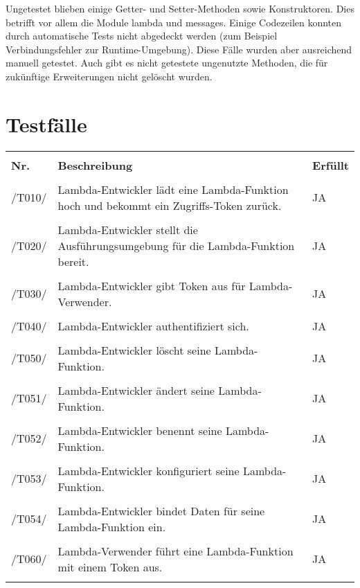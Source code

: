 \documentclass[a4paper,20pt,oneside]{book}
\begin{document}
	Ungetestet blieben einige Getter- und Setter-Methoden sowie Konstruktoren. Dies betrifft vor allem die Module lambda und messages.  Einige Codezeilen konnten durch automatische Tests nicht abgedeckt werden (zum Beispiel Verbindungsfehler zur Runtime-Umgebung). Diese Fälle wurden aber ausreichend manuell getestet. Auch gibt es nicht getestete ungenutzte Methoden, die für zukünftige Erweiterungen nicht gelöscht wurden.
	
	
	\chapter{Testfälle}
	\begin{longtable}{lp{10cm}p{3cm}}
		\hline \\
		\textbf{Nr.} & \textbf{Beschreibung} & \textbf{Erfüllt} \\ \hline\hline \\ 
		/T010/ & Lambda-Entwickler lädt eine Lambda-Funktion hoch und bekommt ein Zugriffs-Token zurück. & JA   \\ \hline \\
		/T020/ & Lambda-Entwickler stellt die Ausführungsumgebung für die Lambda-Funktion bereit. & JA\\ \hline \\
		/T030/ & Lambda-Entwickler gibt Token aus für Lambda-Verwender. & JA\\ \hline \\
		/T040/ & Lambda-Entwickler authentifiziert sich. & JA\\ \hline \\
		/T050/ & Lambda-Entwickler löscht seine Lambda-Funktion. & JA \\ \hline \\
		/T051/ & Lambda-Entwickler ändert seine Lambda-Funktion. & JA \\ \hline \\
		/T052/ & Lambda-Entwickler benennt seine Lambda-Funktion. & JA\\ \hline \\
		/T053/ & Lambda-Entwickler konfiguriert seine Lambda-Funktion. & JA\\ \hline \\
		/T054/ & Lambda-Entwickler bindet Daten für seine Lambda-Funktion ein. & JA \\ \hline \\
		/T060/ & Lambda-Verwender führt eine Lambda-Funktion mit einem Token aus. & JA\\ \hline \\

\end{longtable}
\end{document}
